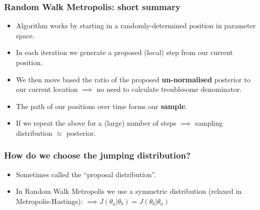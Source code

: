 \documentclass[handout]{beamer}
\begin{document}
\begin{frame}
\frametitle{Random Walk Metropolis: short summary}

\begin{itemize}
\item<2-> Algorithm works by starting in a randomly-determined position in parameter space.
\item<3-> In each iteration we generate a proposed (local) step from our current position.
\item<4-> We then move based the ratio of the proposed \textbf{un-normalised} posterior to our current location $\implies$ no need to calculate troublesome denominator.
\item<5-> The path of our positions over time forms our \textbf{sample}.
\item<6-> If we repeat the above for a (large) number of steps $\implies$ sampling distribution $\approx$ posterior.
\end{itemize}

\end{frame}

\begin{frame}
\frametitle{How do we choose the jumping distribution?}

\begin{itemize}
\item<2-> Sometimes called the ``proposal distribution''.
\item<3-> In Random Walk Metropolis we use a symmetric distribution (relaxed in Metropolis-Hastings):
 $\implies J(\theta_a|\theta_b) = J(\theta_b|\theta_a)$
\end{itemize}


\end{frame}
\end{document}
